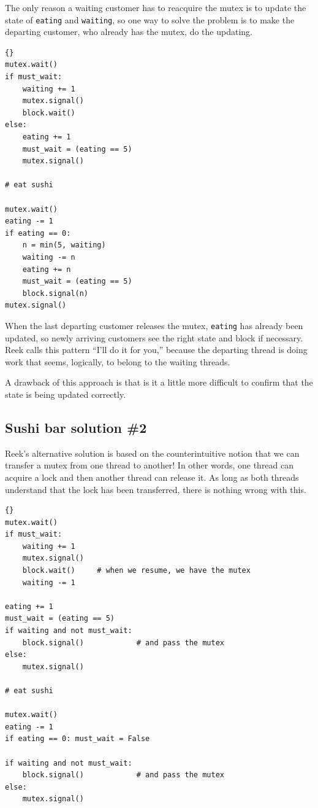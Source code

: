\documentclass{book}
\newcommand{\clearemptydoublepage}{\newpage\cleardoublepage}
\begin{document}
The only reason a waiting customer has to reacquire the mutex
is to update the state of {\tt eating} and {\tt waiting}, so
one way to solve the problem is to make the departing customer,
who already has the mutex, do the updating.

\begin{lstlisting}[title={Sushi bar solution \#1}]{}
mutex.wait()
if must_wait:
    waiting += 1
    mutex.signal()
    block.wait()
else:
    eating += 1
    must_wait = (eating == 5)
    mutex.signal()

# eat sushi

mutex.wait()
eating -= 1
if eating == 0:
    n = min(5, waiting)
    waiting -= n
    eating += n
    must_wait = (eating == 5)
    block.signal(n)
mutex.signal()
\end{lstlisting}

When the last departing customer releases the mutex, 
{\tt eating} has already been updated, so newly arriving customers
see the right state and block if necessary.  Reek calls this
pattern ``I'll do it for you,'' because the departing thread
is doing work that seems, logically, to belong to the waiting
threads.

A drawback of this approach is that is it a little more difficult
to confirm that the state is being updated correctly.


\clearemptydoublepage
\subsection {Sushi bar solution \#2}

Reek's alternative solution is based on the counterintuitive
notion that we can transfer a mutex from one thread to another!
In other words, one thread can acquire a lock and then another
thread can release it.  As long as both threads understand
that the lock has been transferred, there is nothing wrong with
this.

\begin{lstlisting}[title={Sushi bar solution \#2}]{}
mutex.wait()
if must_wait:
    waiting += 1
    mutex.signal()
    block.wait()     # when we resume, we have the mutex
    waiting -= 1

eating += 1
must_wait = (eating == 5)
if waiting and not must_wait:
    block.signal()            # and pass the mutex
else:
    mutex.signal()

# eat sushi

mutex.wait()
eating -= 1
if eating == 0: must_wait = False

if waiting and not must_wait:
    block.signal()            # and pass the mutex
else:
    mutex.signal()
\end{lstlisting}
\end{document}
